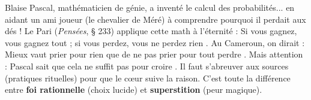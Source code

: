 \documentclass[11pt]{article}
\begin{document}
\begin{savaistu}
Blaise Pascal, mathématicien de génie, a inventé le calcul des probabilités... en aidant un ami joueur (le chevalier de Méré) à comprendre pourquoi il perdait aux dés ! Le \guillemotleft Pari \guillemotright (\emph{Pensées}, § 233) applique cette math à l'éternité : \guillemotleft Si vous gagnez, vous gagnez tout ; si vous perdez, vous ne perdez rien \guillemotright. Au Cameroun, on dirait : \guillemotleft Mieux vaut prier pour rien que de ne pas prier pour tout perdre \guillemotright. Mais attention : Pascal sait que \guillemotleft cela ne suffit pas pour croire \guillemotright. Il faut \guillemotleft s'abreuver aux sources \guillemotright (pratiques rituelles) pour que le cœur suive la raison. C'est toute la différence entre \textbf{foi rationnelle} (choix lucide) et \textbf{superstition} (peur magique).
\end{savaistu}
\end{document}
